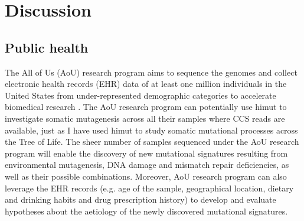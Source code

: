 %

\section{Discussion}

\subsection{Public health}

The All of Us (AoU) research program aims to sequence the genomes and collect electronic health records (EHR) data of at least one million individuals in the United States from under-represented demographic categories to accelerate biomedical research \cite{AoU2019}. The AoU research program can potentially use himut to investigate somatic mutagenesis across all their samples where CCS reads are available, just as I have used himut to study somatic mutational processes across the Tree of Life. The sheer number of samples sequenced under the AoU research program will enable the discovery of new mutational signatures resulting from environmental mutagenesis, DNA damage and mismatch repair deficiencies, as well as their possible combinations. Moreover, AoU research program can also leverage the EHR records (e.g. age of the sample, geographical location, dietary and drinking habits and drug prescription history) to develop and evaluate hypotheses about the aetiology of the newly discovered mutational signatures.

